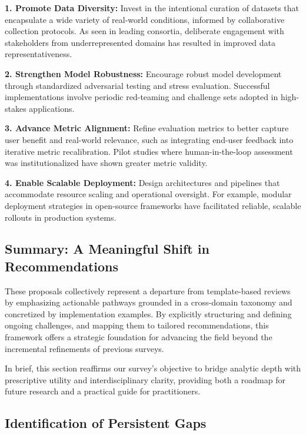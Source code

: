 \documentclass[sigconf]{acmart}
\begin{document}
\textbf{1. Promote Data Diversity:} Invest in the intentional curation of datasets that encapsulate a wide variety of real-world conditions, informed by collaborative collection protocols. As seen in leading consortia, deliberate engagement with stakeholders from underrepresented domains has resulted in improved data representativeness.

\textbf{2. Strengthen Model Robustness:} Encourage robust model development through standardized adversarial testing and stress evaluation. Successful implementations involve periodic red-teaming and challenge sets adopted in high-stakes applications.

\textbf{3. Advance Metric Alignment:} Refine evaluation metrics to better capture user benefit and real-world relevance, such as integrating end-user feedback into iterative metric recalibration. Pilot studies where human-in-the-loop assessment was institutionalized have shown greater metric validity.

\textbf{4. Enable Scalable Deployment:} Design architectures and pipelines that accommodate resource scaling and operational oversight. For example, modular deployment strategies in open-source frameworks have facilitated reliable, scalable rollouts in production systems.

\subsection{Summary: A Meaningful Shift in Recommendations}

These proposals collectively represent a departure from template-based reviews by emphasizing actionable pathways grounded in a cross-domain taxonomy and concretized by implementation examples. By explicitly structuring and defining ongoing challenges, and mapping them to tailored recommendations, this framework offers a strategic foundation for advancing the field beyond the incremental refinements of previous surveys. 

In brief, this section reaffirms our survey's objective to bridge analytic depth with prescriptive utility and interdisciplinary clarity, providing both a roadmap for future research and a practical guide for practitioners.

\subsection{Identification of Persistent Gaps}
\end{document}
